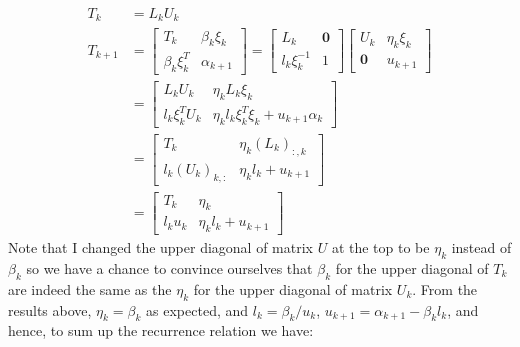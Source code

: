 \documentclass[]{article}
\theoremstyle{definition}
\begin{document}
            \begin{align}
                T_k &= L_kU_k
                \\
                T_{k + 1} &= \begin{bmatrix}
                    T_k & \beta_k \xi_k \\
                    \beta_k \xi^T_k & \alpha_{k + 1}
                \end{bmatrix} = 
                \begin{bmatrix}
                    L_k & \mathbf{0} \\ l_k \xi_k^{-1} & 1
                \end{bmatrix}
                \begin{bmatrix}
                    U_k & \eta_k \xi_k \\
                    \mathbf{0} & u_{k + 1}
                \end{bmatrix}
                \\
                &= 
                \begin{bmatrix}
                    L_kU_k & \eta_k L_k \xi_k 
                    \\
                    l_k \xi_k^TU_k & \eta_k l_k \xi_k^T \xi_k + u_{k + 1}\alpha_k
                \end{bmatrix}
                \\
                &= 
                \begin{bmatrix}
                    T_k & \eta_k (L_k)_{:, k} \\ 
                    l_k(U_k)_{k, :} & \eta_k l_k + u_{k + 1}
                \end{bmatrix}
                \\
                &= 
                \begin{bmatrix}
                    T_k & \eta_k \\
                    l_k u_k & \eta_k l_k + u_{k + 1}
                \end{bmatrix}
            \end{align}
            Note that I changed the upper diagonal of matrix $U$ at the top to be $\eta_k$ instead of $\beta_k$ so we have a chance to convince ourselves that $\beta_k$ for the upper diagonal of $T_k$ are indeed the same as the $\eta_k$ for the upper diagonal of matrix $U_k$. From the results above, $\eta_k = \beta_k$ as expected, and $l_k = \beta_k/u_k$, $u_{k + 1} = \alpha_{k +1} - \beta_{k}l_k$, and hence, to sum up the recurrence relation we have: 
\end{document}
